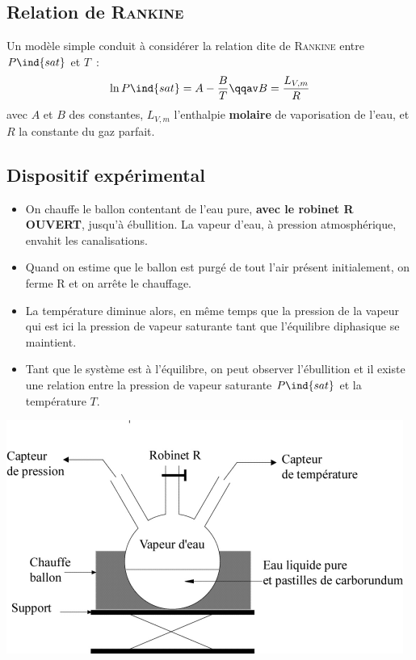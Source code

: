 \documentclass[a4paper, 10pt, final, garamond]{book}
\begin{document}
{	\subsection{Relation de \textsc{Rankine}}
	Un modèle simple conduit à considérer la relation dite de \textsc{Rankine}
	entre $P\ind{sat}$ et $T$~:
	\[
		\ln P\ind{sat} = A - \frac{B}{T}
		\qqav
		B = \frac{L_{V,m}}{R}
	\]
	avec $A$ et $B$ des constantes, $L_{V,m}$ l'enthalpie \textbf{molaire} de
	vaporisation de l'eau, et $R$ la constante du gaz parfait.
	\subsection{Dispositif expérimental}
	\begin{isd}
		\begin{itemize}
			\item On chauffe le ballon contentant de l'eau pure, \textbf{avec le robinet R
				      OUVERT}, jusqu'à ébullition. La vapeur d'eau, à pression
			      atmosphérique, envahit les canalisations.

			\item Quand on estime que le ballon est purgé de tout l'air présent
			      initialement, on ferme R et on arrête le chauffage.

			\item La température diminue alors, en même temps que la pression de la vapeur
			      qui est ici la pression de vapeur saturante tant que l'équilibre
			      diphasique se maintient.

			\item Tant que le système est à l'équilibre, on peut observer l'ébullition et il
			      existe une relation entre la pression de vapeur saturante $P\ind{sat}$
			      et la température $T$.
		\end{itemize}
		\tcblower
		\begin{center}
			\includegraphics[width=1\linewidth]{dispo_exp}
		\end{center}
	\end{isd}
}
\end{document}
